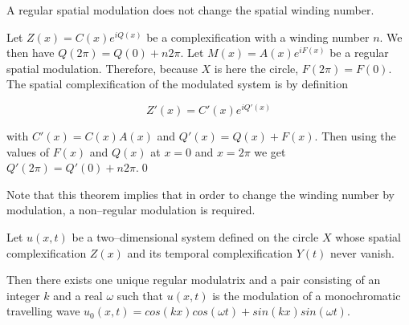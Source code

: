 \begin{thm}
A regular spatial modulation does not change the spatial winding number.
\end{thm}

\begin{pf}
Let $Z(x)=C(x)e^{iQ(x)}$ be a complexification with a winding number $n$. 
We then have $Q(2\pi)=Q(0)+n2\pi$.
Let $M(x)=A(x)e^{iF(x)}$ be a regular spatial modulation. Therefore, 
because $X$ is here  the circle, $F(2\pi)=F(0)$.
The spatial complexification of the modulated system is by definition

\begin{equation}
Z'(x)=C'(x)e^{iQ'(x)}
\end{equation}

with $C'(x)=C(x)A(x)$ and $Q'(x)=Q(x)+F(x)$. 
Then using the values of $F(x)$ and $Q(x)$ at $x=0$ and $x=2\pi$
we get $Q'(2\pi)=Q'(0)+n2\pi$.\qed\end{pf}


Note that this theorem implies that in order to change the winding number
by modulation, a non--regular modulation is required.
%

\begin{thm}
Let $u(x,t)$  be a two--dimensional system defined on the circle $X$
 whose spatial complexification $Z(x)$ and its temporal 
complexification $Y(t)$ never vanish.

Then there exists one unique regular modulatrix and a pair
consisting of an 
integer $k$ and a real $\omega$ such that $u(x,t)$ is the modulation 
of a monochromatic travelling wave 
$u_0(x,t)=cos(kx)cos(\omega t)+sin(kx)sin(\omega t)$.\label{theomod}
\end{thm}


